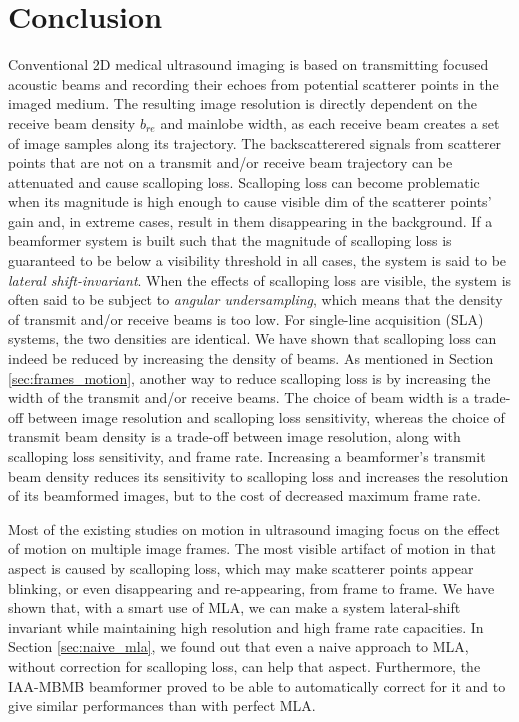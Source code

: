 
\chapter{Conclusion}
\label{chap:conclusion}
Conventional 2D medical ultrasound imaging is based on transmitting focused acoustic beams and recording their echoes from potential scatterer points in the imaged medium.
The resulting image resolution is directly dependent on the receive beam density $b_{re}$ and mainlobe width, as each receive beam creates a set of image samples along its trajectory.
The backscatterered signals from scatterer points that are not on a transmit and/or receive beam trajectory can be attenuated and cause scalloping loss.
Scalloping loss can become problematic when its magnitude is high enough to cause visible dim of the scatterer points' gain and, in extreme cases, result in them disappearing in the background.
If a beamformer system is built such that the magnitude of scalloping loss is guaranteed to be below a visibility threshold in all cases, the system is said to be \textit{lateral shift-invariant}.
When the effects of scalloping loss are visible, the system is often said to be subject to \textit{angular undersampling}, which means that the density of transmit and/or receive beams is too low.
For single-line acquisition (SLA) systems, the two densities are identical. 
We have shown that scalloping loss can indeed be reduced by increasing the density of beams.
As mentioned in Section \ref{sec:frames_motion}, another way to reduce scalloping loss is by increasing the width of the transmit and/or receive beams.
The choice of beam width is a trade-off between image resolution and scalloping loss sensitivity, whereas the choice of transmit beam density is a trade-off between image resolution, along with scalloping loss sensitivity, and frame rate.
Increasing a beamformer's transmit beam density reduces its sensitivity to scalloping loss and increases the resolution of its beamformed images, but to the cost of decreased maximum frame rate.

Most of the existing studies on motion in ultrasound imaging focus on the effect of motion on multiple image frames. The most visible artifact of motion in that aspect is caused by scalloping loss, which may make scatterer points appear blinking, or even disappearing and re-appearing, from frame to frame.
We have shown that, with a smart use of MLA, we can make a system lateral-shift invariant while maintaining high resolution and high frame rate capacities.
In Section \ref{sec:naive_mla}, we found out that even a naive approach to MLA, without correction for scalloping loss, can help that aspect. Furthermore, the IAA-MBMB beamformer proved to be able to automatically correct for it and to give similar performances than with perfect MLA.

